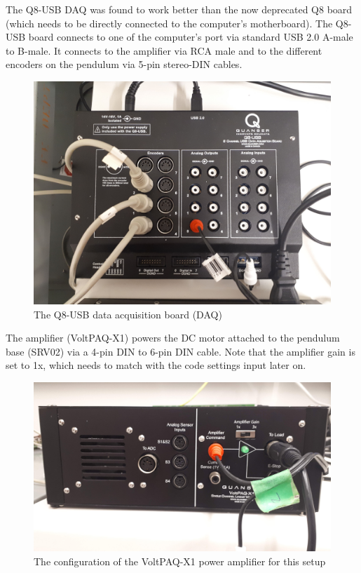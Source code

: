 \documentclass[12pt,letterpaper]{article}
\begin{document}
The Q8-USB DAQ was found to work better than the now deprecated Q8 board (which needs to be directly connected to the computer's motherboard). The Q8-USB board connects to one of the computer's port via standard USB 2.0 A-male to B-male. It connects to the amplifier via RCA male and to the different encoders on the pendulum via 5-pin stereo-DIN cables.


\begin{figure}[H]
\centering
\includegraphics[scale=0.07]{img/daq.jpg}
\caption[Simulation results]{The Q8-USB data acquisition board (DAQ)}
\label{fig:daq}
\end{figure}

The amplifier (VoltPAQ-X1) powers the DC motor attached to the pendulum base (SRV02) via a 4-pin DIN to 6-pin DIN cable. Note that the amplifier gain is set to 1x, which needs to match with the code settings input later on.

\begin{figure}[H]
\centering
\includegraphics[scale=0.07]{img/amp.jpg}
\caption{The configuration of the VoltPAQ-X1 power amplifier for this setup}
\label{fig:amp}
\end{figure}
\end{document}
